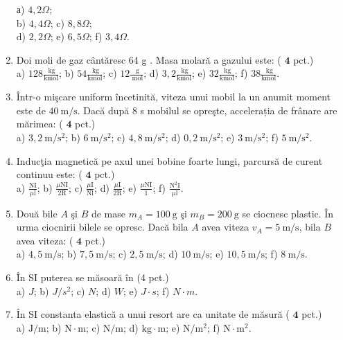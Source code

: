 \begin{enumerate}
а) $4,2 \Omega$;\\
b) $4,4 \Omega$; c) $8,8 \Omega$;\\
d) $2,2 \Omega$; e) $6,5 \Omega$; f) $3,4 \Omega$.
  \item Doi moli de gaz cântăresc 64 g . Masa molară a gazului este: ( $\mathbf{4}$ pct.)\\
a) $128 \frac{\mathrm{~kg}}{\mathrm{kmol}}$; b) $54 \frac{\mathrm{~kg}}{\mathrm{kmol}}$; c) $12 \frac{\mathrm{~g}}{\mathrm{~mol}}$; d) $3,2 \frac{\mathrm{~kg}}{\mathrm{kmol}}$; e) $32 \frac{\mathrm{~kg}}{\mathrm{kmol}}$; f) $38 \frac{\mathrm{~kg}}{\mathrm{kmol}}$.
  \item Într-o mişcare uniform încetinită, viteza unui mobil la un anumit moment este de $40 \mathrm{~m} / \mathrm{s}$. Dacă după 8 s mobilul se opreşte, accelerația de frânare are mărimea: ( $\mathbf{4}$ pct.)\\
a) $3,2 \mathrm{~m} / \mathrm{s}^{2}$; b) $6 \mathrm{~m} / \mathrm{s}^{2}$; c) $4,8 \mathrm{~m} / \mathrm{s}^{2}$; d) $0,2 \mathrm{~m} / \mathrm{s}^{2}$; e) $3 \mathrm{~m} / \mathrm{s}^{2}$; f) $5 \mathrm{~m} / \mathrm{s}^{2}$.
  \item Inducţia magnetică pe axul unei bobine foarte lungi, parcursă de curent continuu este: ( $\mathbf{4}$ pct.)\\
a) $\frac{\mathrm{NI}}{\mu \mathrm{l}}$; b) $\frac{\mu \mathrm{NI}}{2 \mathrm{R}}$; c) $\frac{\mu \mathrm{I}}{\mathrm{Nl}}$; d) $\frac{\mu \mathrm{I}}{2 \mathrm{R}}$; e) $\frac{\mu \mathrm{NI}}{1}$; f) $\frac{\mathrm{N}^{2} \mathrm{I}}{\mu \mathrm{l}}$.
  \item Două bile $A$ şi $B$ de mase $m_{A}=100 \mathrm{~g}$ şi $m_{B}=200 \mathrm{~g}$ se ciocnesc plastic. În urma ciocnirii bilele se opresc. Dacă bila $A$ avea viteza $v_{A}=5 \mathrm{~m} / \mathrm{s}$, bila $B$ avea viteza: ( $\mathbf{4}$ pct.)\\
a) $4,5 \mathrm{~m} / \mathrm{s}$; b) $7,5 \mathrm{~m} / \mathrm{s}$; c) $2,5 \mathrm{~m} / \mathrm{s}$; d) $10 \mathrm{~m} / \mathrm{s}$; e) $10,5 \mathrm{~m} / \mathrm{s}$; f) $8 \mathrm{~m} / \mathrm{s}$.
  \item În SI puterea se măsoară în (4 pct.)\\
a) $J$; b) $J / s^{2}$; c) $N$; d) $W$; e) $J \cdot s$; f) $N \cdot m$.
  \item În SI constanta elastică a unui resort are ca unitate de măsură ( $\mathbf{4}$ pct.)\\
a) $\mathrm{J} / \mathrm{m}$; b) $\mathrm{N} \cdot \mathrm{m}$; c) $\mathrm{N} / \mathrm{m}$; d) $\mathrm{kg} \cdot \mathrm{m}$; e) $\mathrm{N} / \mathrm{m}^{2}$; f) $\mathrm{N} \cdot \mathrm{m}^{2}$.

\end{enumerate}
